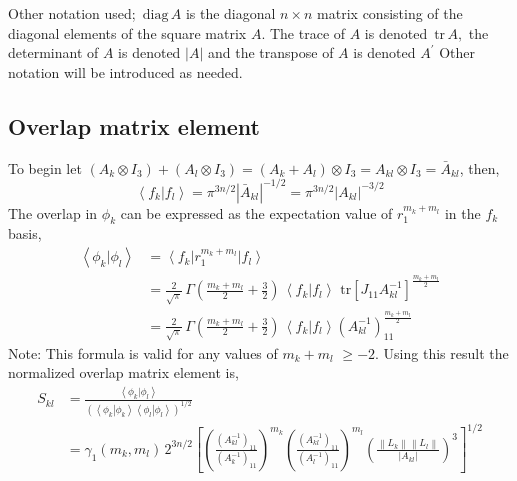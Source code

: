 \documentclass[12pt]{article}
\begin{document}
Other notation used; $\,\mathrm{diag}\,A$ is the diagonal $n\times n$ matrix
consisting of the diagonal elements of the square matrix $A.$ The trace of $A
$ is denoted $\,\mathrm{tr}\,A,$ the determinant of $A$ is denoted $|A|$ and
the transpose of $A$ is denoted $A^{\prime}$ Other notation will be introduced
as needed.

\subsection{Overlap matrix element}

To begin let $\left(  A_{k}\otimes I_{3}\right)  +\left(  A_{l}\otimes
I_{3}\right)  =\left(  A_{k}+A_{l}\right)  \otimes I_{3}=A_{kl}\otimes
I_{3}=\bar{A}_{kl}$, then,
\begin{equation}
\left\langle f_{k}\right.  |\left.  f_{l}\right\rangle =\pi^{3n/2}\left|
\bar{A}_{kl}\right|  ^{-1/2}=\pi^{3n/2}\left|  A_{kl}\right|  ^{-3/2}%
\end{equation}
The overlap in $\phi_{k}$ can be expressed as the expectation value of
$r_{1}^{m_{k}+m_{l}}$ in the $f_{k}$ basis,
\begin{align}
\left\langle \phi_{k}\right.  |\left.  \phi_{l}\right\rangle  & =\left\langle
f_{k}\right|  r_{1}^{m_{k}+m_{l}}\left|  f_{l}\right\rangle \label{ov1}\\
& =\frac{2}{\sqrt{\pi}}\,\Gamma\left(  \frac{m_{k}+m_{l}}{2}+\frac{3}%
{2}\right)  \,\left\langle f_{k}\right.  |\left.  f_{l}\right\rangle
\,\,\mathrm{tr}\left[  J_{11}A_{kl}^{-1}\right]  ^{\frac{m_{k}+m_{l}}{2}%
}\nonumber\\
& =\frac{2}{\sqrt{\pi}}\,\Gamma\left(  \frac{m_{k}+m_{l}}{2}+\frac{3}%
{2}\right)  \,\left\langle f_{k}\right.  |\left.  f_{l}\right\rangle \left(
A_{kl}^{-1}\right)  _{11}^{\frac{m_{k}+m_{l}}{2}}\nonumber
\end{align}
Note: This formula is valid for any values of $m_{k}+m_{l}$ $\geqslant-2.$
Using this result the normalized overlap matrix element is,
\begin{align}
S_{kl}  & =\frac{\left\langle \phi_{k}\right.  |\left.  \phi_{l}\right\rangle
}{\left(  \left\langle \phi_{k}\right.  |\left.  \phi_{k}\right\rangle
\left\langle \phi_{l}\right.  |\left.  \phi_{l}\right\rangle \right)  ^{1/2}%
}\label{Skl}\\
& =\gamma_{1}\left(  m_{k},m_{l}\right)  \,2^{3n/2}\left[  \left(
\frac{\left(  A_{kl}^{-1}\right)  _{11}}{\left(  A_{k}^{-1}\right)  _{11}%
}\right)  ^{m_{k}}\left(  \frac{\left(  A_{kl}^{-1}\right)  _{11}}{\left(
A_{l}^{-1}\right)  _{11}}\right)  ^{m_{l}}\left(  \frac{\left\|
L_{k}\right\|  \left\|  L_{l}\right\|  }{\left|  A_{kl}\right|  }\right)
^{3}\right]  ^{1/2}\nonumber
\end{align}
\end{document}
